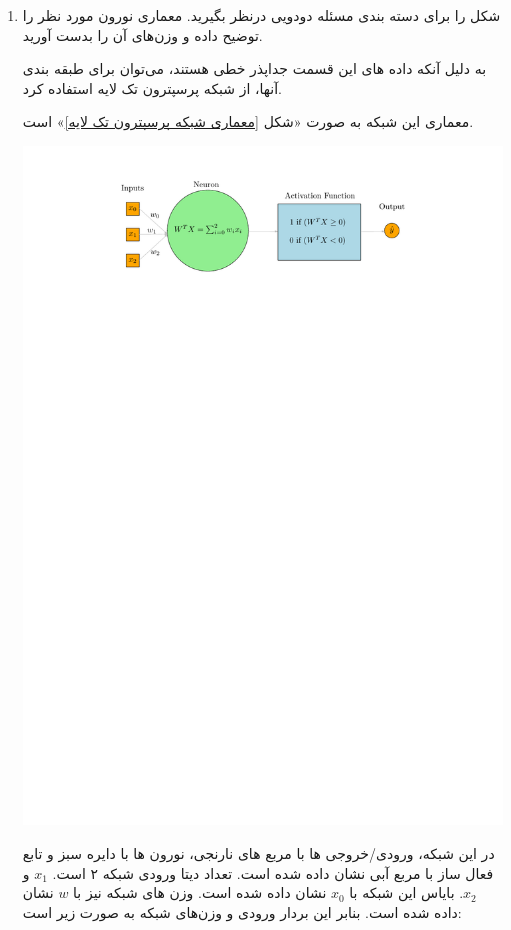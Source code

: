 \begin{enumerate}
	\item شکل  را برای دسته بندی مسئله دودویی درنظر بگیرید. معماری نورون مورد نظر را توضیح داده و وزن‌های آن را بدست آورید.
	
	\begin{qsolve}
		به دلیل آنکه داده های این قسمت جداپذر خطی هستند، می‌توان برای طبقه بندی آنها، از شبکه پرسپترون تک لایه استفاده کرد.
		
		معماری این شبکه به صورت «شکل \ref{معماری شبکه پرسپترون تک لایه}» است.
		
		
		\begin{center}
			\includegraphics*[width=0.8\linewidth]{pics/img2.pdf}
			\label{معماری شبکه پرسپترون تک لایه}
		\end{center}
	\end{qsolve}
	
	\begin{qsolve}
				در این شبکه، ورودی/خروجی ها با مربع های نارنجی، نورون ها با دایره سبز و تابع فعال ساز با مربع آبی نشان داده شده است. تعداد دیتا ورودی شبکه ۲ است. $x_1$ و $x_2$. بایاس این شبکه با $x_0$ نشان داده شده است. وزن های شبکه نیز با $w$ نشان داده شده است. بنابر این بردار ورودی و وزن‌های شبکه به صورت زیر است:
		

\end{qsolve}
\end{enumerate}
